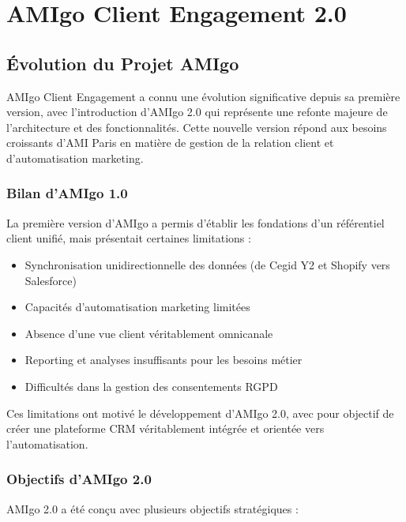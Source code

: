 
\chapter{AMIgo Client Engagement 2.0}

\section{Évolution du Projet AMIgo}

AMIgo Client Engagement a connu une évolution significative depuis sa première version, avec l'introduction d'AMIgo 2.0 qui représente une refonte majeure de l'architecture et des fonctionnalités. Cette nouvelle version répond aux besoins croissants d'AMI Paris en matière de gestion de la relation client et d'automatisation marketing.

\subsection{Bilan d'AMIgo 1.0}

La première version d'AMIgo a permis d'établir les fondations d'un référentiel client unifié, mais présentait certaines limitations :

\begin{itemize}
    \item Synchronisation unidirectionnelle des données (de Cegid Y2 et Shopify vers Salesforce)
    \item Capacités d'automatisation marketing limitées
    \item Absence d'une vue client véritablement omnicanale
    \item Reporting et analyses insuffisants pour les besoins métier
    \item Difficultés dans la gestion des consentements RGPD
\end{itemize}

Ces limitations ont motivé le développement d'AMIgo 2.0, avec pour objectif de créer une plateforme CRM véritablement intégrée et orientée vers l'automatisation.

\subsection{Objectifs d'AMIgo 2.0}

AMIgo 2.0 a été conçu avec plusieurs objectifs stratégiques :

